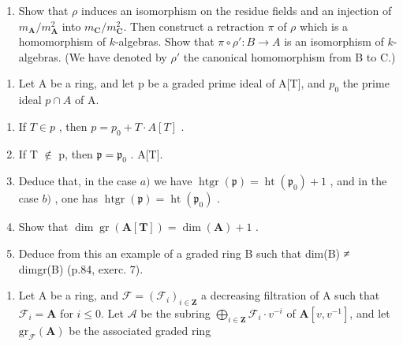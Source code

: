 \begin{enumerate}
\def\labelenumi{\alph{enumi})}
\setcounter{enumi}{2}
\tightlist
\item
  Show that \(\rho\) induces an isomorphism on the residue fields and an injection of \(m_{\mathbf{A}}/m_{\mathbf{A}}^{2}\) into \(m_{\mathbf{C}}/m_{\mathbf{C}}^{2}\). Then construct a retraction \(\pi\) of \(\rho\) which is a homomorphism of \(k\)-algebras. Show that \(\pi \circ \rho': B \to A\) is an isomorphism of \(k\)-algebras. (We have denoted by \(\rho'\) the canonical homomorphism from B to C.)
\end{enumerate}


\begin{enumerate}
\def\labelenumi{\arabic{enumi})}
\tightlist
\item
  Let A be a ring, and let p be a graded prime ideal of A{[}T{]}, and \(p_{0}\) the prime ideal \(p \cap A\) of A.
\end{enumerate}

\begin{enumerate}
\def\labelenumi{\alph{enumi})}
\item
  If \(T \in p\) , then \(p = p_{0} + T \cdot A[T]\) .
\item
  If T \(\notin\) p, then \(\mathfrak{p} = \mathfrak{p}_0\) . A{[}T{]}.
\item
  Deduce that, in the case \(a)\) we have \(\operatorname{htgr}(\mathfrak{p}) = \operatorname{ht}(\mathfrak{p}_0) + 1\) , and in the case \(b)\) , one has \(\operatorname{htgr}(\mathfrak{p}) = \operatorname{ht}(\mathfrak{p}_0)\) .
\item
  Show that \(\dim \operatorname{gr}(\mathbf{A}[\mathbf{T}]) = \dim (\mathbf{A}) + 1\) .
\item
  Deduce from this an example of a graded ring B such that dim(B) ≠ dimgr(B) (p.84, exerc. 7).
\end{enumerate}

\begin{enumerate}
\def\labelenumi{\arabic{enumi})}
\setcounter{enumi}{1}
\tightlist
\item
  Let A be a ring, and \(\mathcal{F} = (\mathcal{F}_i)_{i \in \mathbf{Z}}\) a decreasing filtration of A such that \(\mathcal{F}_i = \mathbf{A}\) for \(i \leqslant 0\). Let \(\mathcal{A}\) be the subring \(\bigoplus_{i \in \mathbf{Z}} \mathcal{F}_i \cdot v^{-i}\) of \(\mathbf{A}[v, v^{-1}]\), and let \(\mathrm{gr}_{\mathcal{F}}(\mathbf{A})\) be the associated graded ring
\end{enumerate}

